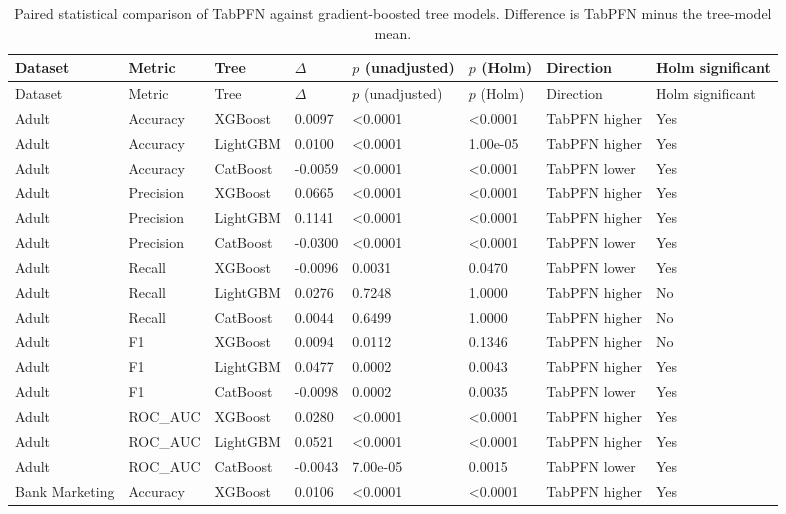 \begingroup
\footnotesize
\setlength{\tabcolsep}{2pt}
\renewcommand{\arraystretch}{1.05}
\begin{longtable}{p{2.6cm}p{1.75cm}p{1.55cm}R{1.1cm}R{1.7cm}R{1.4cm}p{2.2cm}p{1.75cm}}
\caption{Paired statistical comparison of TabPFN against gradient-boosted tree models. Difference is TabPFN minus the tree-model mean.}\label{tab:paired-statistics}\\
\toprule
Dataset & Metric & Tree & $\Delta$ & $p$ (unadjusted) & $p$ (Holm) & Direction & Holm significant \\
\midrule
\endfirsthead
\toprule
Dataset & Metric & Tree & $\Delta$ & $p$ (unadjusted) & $p$ (Holm) & Direction & Holm significant \\
\midrule
\endhead
Adult & Accuracy & XGBoost & 0.0097 & <0.0001 & <0.0001 & TabPFN higher & Yes \\
Adult & Accuracy & LightGBM & 0.0100 & <0.0001 & 1.00e-05 & TabPFN higher & Yes \\
Adult & Accuracy & CatBoost & -0.0059 & <0.0001 & <0.0001 & TabPFN lower & Yes \\
Adult & Precision & XGBoost & 0.0665 & <0.0001 & <0.0001 & TabPFN higher & Yes \\
Adult & Precision & LightGBM & 0.1141 & <0.0001 & <0.0001 & TabPFN higher & Yes \\
Adult & Precision & CatBoost & -0.0300 & <0.0001 & <0.0001 & TabPFN lower & Yes \\
Adult & Recall & XGBoost & -0.0096 & 0.0031 & 0.0470 & TabPFN lower & Yes \\
Adult & Recall & LightGBM & 0.0276 & 0.7248 & 1.0000 & TabPFN higher & No \\
Adult & Recall & CatBoost & 0.0044 & 0.6499 & 1.0000 & TabPFN higher & No \\
Adult & F1 & XGBoost & 0.0094 & 0.0112 & 0.1346 & TabPFN higher & No \\
Adult & F1 & LightGBM & 0.0477 & 0.0002 & 0.0043 & TabPFN higher & Yes \\
Adult & F1 & CatBoost & -0.0098 & 0.0002 & 0.0035 & TabPFN lower & Yes \\
Adult & ROC\_AUC & XGBoost & 0.0280 & <0.0001 & <0.0001 & TabPFN higher & Yes \\
Adult & ROC\_AUC & LightGBM & 0.0521 & <0.0001 & <0.0001 & TabPFN higher & Yes \\
Adult & ROC\_AUC & CatBoost & -0.0043 & 7.00e-05 & 0.0015 & TabPFN lower & Yes \\
Bank Marketing & Accuracy & XGBoost & 0.0106 & <0.0001 & <0.0001 & TabPFN higher & Yes \\

\end{longtable}
